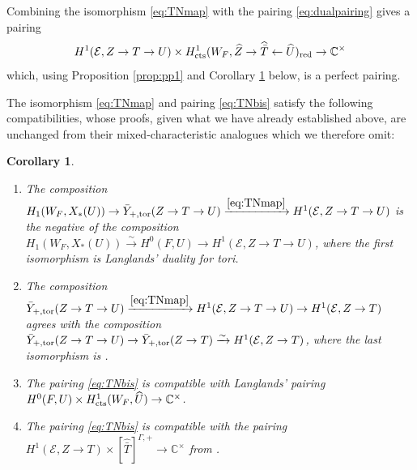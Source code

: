 \documentclass{amsart}
\newtheorem{corollary}[result]{Corollary}
\theoremstyle{definition}
\theoremstyle{remark}
\newcommand\cts{\textnormal{cts}}
\begin{document}
Combining the isomorphism \eqref{eq:TNmap} with the pairing \eqref{eq:dualpairing} gives a pairing
\begin{equation}\label{eq:TNbis}
    H^{1}(\mathcal{E}, Z \to T\to U) \times H^{1}_{\textnormal{cts}}(W_{F}, \widehat{Z} \to \widehat{\bar{T}} \leftarrow \widehat{U})_{\textnormal{red}} \to \mathbb{C}^{\times}
\end{equation}
which, using Proposition \ref{prop:pp1} and Corollary \ref{cor:TN} below, is a perfect pairing.

The isomorphism \eqref{eq:TNmap} and pairing \eqref{eq:TNbis} satisfy the following compatibilities, whose proofs, given what we have already established above, are unchanged from their mixed-characteristic analogues \cite[Lemma 5.10, Corollary 5.11]{Kal26b} which we therefore omit:

\begin{corollary}\label{cor:TN}
    \begin{enumerate}
        \item The composition $H_{1}(W_{F},X_{*}(U)) \to  \bar{Y}_{+,\textnormal{tor}}(Z \to T \to U) \xrightarrow{\eqref{eq:TNmap}} H^{1}(\mathcal{E}, Z \to T \to U)$ is the negative of the composition $H_{1}(W_{F}, X_{*}(U)) \xrightarrow{\sim} H^{0}(F,U) \to H^{1}(\mathcal{E}, Z \to T \to U)$, where the first isomorphism is Langlands' duality for tori.
        \item The composition $\bar{Y}_{+,\textnormal{tor}}(Z \to T \to U) \xrightarrow{\eqref{eq:TNmap}} H^{1}(\mathcal{E}, Z \to T \to U) \to H^{1}(\mathcal{E}, Z \to T)$ agrees with the composition $\bar{Y}_{+,\textnormal{tor}}(Z \to T \to U) \to \bar{Y}_{+,\textnormal{tor}}(Z \to T) \xrightarrow{\sim} H^{1}(\mathcal{E}, Z \to T)$, where the last isomorphism is \cite[Theorem 4.10]{Dillery1}.
        \item The pairing \eqref{eq:TNbis} is compatible with Langlands' pairing $H^{0}(F,U) \times H^{1}_{\cts}(W_{F}, \widehat{U}) \to \mathbb{C}^{\times}$. 
        \item The pairing \eqref{eq:TNbis} is compatible with the pairing $H^{1}(\mathcal{E}, Z \to T) \times [\widehat{\bar{T}}]^{\Gamma,+} \to \mathbb{C}^{\times}$ from \cite[Corollary 7.11]{Dillery1}.
    \end{enumerate}
\end{corollary}
\end{document}
